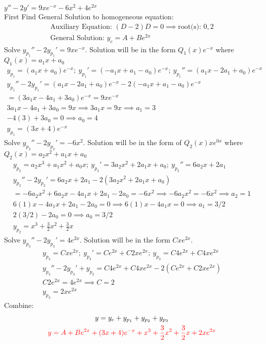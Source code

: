 \item [38.] $y''-2y'=9xe^{-x}-6x^2+4e^{2x}$\\[2mm]
First Find General Solution to homogeneous equation:
\begin{gather*}
    \text{Auxiliary Equation: } (D-2)D=0
    \implies \text{root(s): } 0,2\\
    \text{General Solution: } y_c=A+Be^{2x}
\end{gather*}
Solve $y_{p_1}''-2y_{p_1}'=9xe^{-x}$. Solution will be in the form $Q_1(x)e^{-x}$ where $Q_1(x)=a_1x+a_0$
\begin{gather*}
    y_{p_1}=(a_1x+a_0)e^{-x};\:y_{p_1}'=(-a_1x+a_1-a_0)e^{-x};\:y_{p_1}''=(a_1x-2a_1+a_0)e^{-x}\\
    y_{p_1}''-2y_{p_1}'=
    (a_1x-2a_1+a_0)e^{-x}
    -2(-a_1x+a_1-a_0)e^{-x}\\
    =(3a_1x-4a_1+3a_0)e^{-x}=9xe^{-x}\\
    3a_1x-4a_1+3a_0=9x \implies 3a_1x=9x \implies a_1 = 3\\
    -4(3)+3a_0=0 \implies a_0=4\\
    y_{p_1}=(3x+4)e^{-x}
\end{gather*}
Solve $y_{p_2}''-2y_{p_2}'=-6x^2$. Solution will be in the form of $Q_2(x)xe^{0x}$ where $Q_2(x)=a_2x^2+a_1x+a_0$
\begin{gather*}
    y_{p_2}=a_2x^3+a_1x^2+a_0x;\:y_{p_2}'=3a_2x^2+2a_1x+a_0;\:y_{p_2}''=6a_2x+2a_1\\
    y_{p_2}''-2y_{p_2}'=6a_2x+2a_1-2(3a_2x^2+2a_1x+a_0)\\
    =-6a_2x^2+6a_2x-4a_1x+2a_1-2a_0=-6x^2 \implies -6a_2x^2=-6x^2 \implies a_2 = 1\\
    6(1)x-4a_1x+2a_1-2a_0=0 \implies 6(1)x-4a_1x=0 \implies a_1 = 3/2\\
    2(3/2)-2a_0=0 \implies a_0 = 3/2\\
    y_{p_2}=x^3+\frac{3}{2}x^2+\frac{3}{2}x
\end{gather*}
Solve $y_{p_3}''-2y_{p_3}'=4e^{2x}$. Solution will be in the form $Cxe^{2x}$.
\begin{gather*}
    y_{p_3}=Cxe^{2x};\:y_{p_3}'=Ce^{2x}+C2xe^{2x};\:y_{p_3}=C4e^{2x}+C4xe^{2x}\\
    y_{p_3}''-2y_{p_3}'+y_{p_3}=C4e^{2x}+C4xe^{2x}-2(Ce^{2x}+C2xe^{2x})\\
    C2e^{2x}=4e^{2x} \implies C=2\\
    y_{p_3}=2xe^{2x}
\end{gather*}
Combine:
\begin{gather*}
    y = y_c+y_{p_1}+y_{p_2}+y_{p_3}\\
    \textcolor{red}{y = A+Be^{2x}
    +(3x+4)e^{-x}
    +x^3+\frac{3}{2}x^2+\frac{3}{2}x
    +2xe^{2x}}
\end{gather*}
